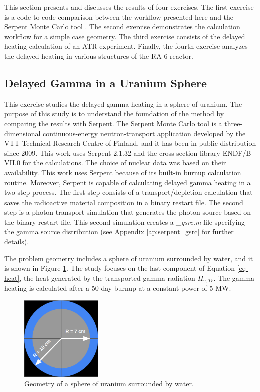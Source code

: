 This section presents and discusses the results of four exercises.
The first exercise is a code-to-code comparison between the workflow presented here and the Serpent Monte Carlo tool \cite{leppanen_serpent_2015}.
The second exercise demonstrates the calculation workflow for a simple case geometry.
The third exercise consists of the delayed heating calculation of an ATR experiment.
Finally, the fourth exercise analyzes the delayed heating in various structures of the RA-6 reactor.


\subsection{Delayed Gamma in a Uranium Sphere}

This exercise studies the delayed gamma heating in a sphere of uranium.
The purpose of this study is to understand the foundation of the method by comparing the results with Serpent.
The Serpent Monte Carlo tool is a three-dimensional continuous-energy neutron-transport application developed by the VTT Technical Research Centre of Finland, and it has been in public distribution since 2009.
This work uses Serpent 2.1.32 and the cross-section library ENDF/B-VII.0 for the calculations.
The choice of nuclear data was based on their availability.
This work uses Serpent because of its built-in burnup calculation routine.
Moreover, Serpent is capable of calculating delayed gamma heating in a two-step process.
The first step consists of a transport/depletion calculation that saves the radioactive material composition in a binary restart file.
The second step is a photon-transport simulation that generates the photon source based on the binary restart file.
This second simulation creates a \textit{\_gsrc.m} file specifying the gamma source distribution (see Appendix \ref{ap:serpent_gsrc} for further details).

The problem geometry includes a sphere of uranium surrounded by water, and it is shown in Figure \ref{fig:exp}.
The study focuses on the last component of Equation \ref{eq-heat}, the heat generated by the transported gamma radiation $H_{\gamma, Tr}$.
The gamma heating is calculated after a 50 day-burnup at a constant power of 5 MW.

\begin{figure}[htbp!]
  \begin{center}
    \includegraphics[width=0.35\textwidth]{figures/axial-view2}
  \end{center}
  \caption{Geometry of a sphere of uranium surrounded by water.}
  \label{fig:exp}
\end{figure}

